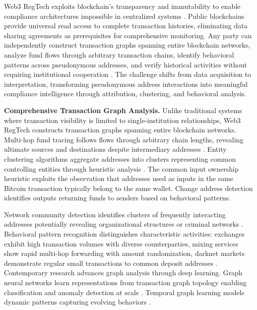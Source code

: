 \documentclass[conference,compsoc]{IEEEtran}
\begin{document}
Web3 RegTech exploits blockchain's transparency and immutability to enable compliance architectures impossible in centralized systems \cite{nakamoto2008bitcoinpeertopeerelectronic,narayanan2016bitcoincryptocurrencytechnologies}. Public blockchains provide universal read access to complete transaction histories, eliminating data sharing agreements as prerequisites for comprehensive monitoring. Any party can independently construct transaction graphs spanning entire blockchain networks, analyze fund flows through arbitrary transaction chains, identify behavioral patterns across pseudonymous addresses, and verify historical activities without requiring institutional cooperation \cite{bonneau2015sokresearchperspectives}. The challenge shifts from data acquisition to interpretation, transforming pseudonymous address interactions into meaningful compliance intelligence through attribution, clustering, and behavioral analysis.

\noindent\textbf{Comprehensive Transaction Graph Analysis.}
Unlike traditional systems where transaction visibility is limited to single-institution relationships, Web3 RegTech constructs transaction graphs spanning entire blockchain networks. Multi-hop fund tracing follows flows through arbitrary chain lengths, revealing ultimate sources and destinations despite intermediary addresses \cite{moser2013inquirymoneylaundering,ron2013quantitativeanalysisfull}. Entity clustering algorithms aggregate addresses into clusters representing common controlling entities through heuristic analysis \cite{meiklejohn2013fistfulbitcoinscharacterizing,reid2013analysisanonymitybitcoin,androulaki2013evaluatinguserprivacy}. The common input ownership heuristic exploits the observation that addresses used as inputs in the same Bitcoin transaction typically belong to the same wallet. Change address detection identifies outputs returning funds to senders based on behavioral patterns.

Network community detection identifies clusters of frequently interacting addresses potentially revealing organizational structures or criminal networks \cite{wu2021detectingmixingservices,drezewski2015applicationsocialnetwork}. Behavioral pattern recognition distinguishes characteristic activities: exchanges exhibit high transaction volumes with diverse counterparties, mixing services show rapid multi-hop forwarding with amount randomization, darknet markets demonstrate regular small transactions to common deposit addresses \cite{moser2018empiricalanalysistraceability}. Contemporary research advances graph analysis through deep learning. Graph neural networks learn representations from transaction graph topology enabling classification and anomaly detection at scale \cite{weber2019antimoneylaunderingbitcoin,azad2025machinelearningblockchain,ancelotti2024reviewblockchainapplication}. Temporal graph learning models dynamic patterns capturing evolving behaviors \cite{arnold2024insightscaveatsmining,luo2025optimizingblockchainanalysis}.
\end{document}
